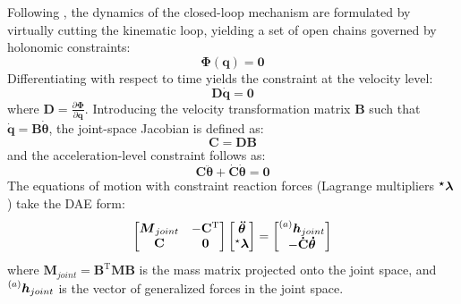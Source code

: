 Following \cite{nikravesh}, the dynamics of the closed-loop mechanism are formulated by virtually cutting the kinematic loop, yielding a set of open chains governed by holonomic constraints:
\begin{equation}
    \label{eq:general_loop_constraint}
    \boldsymbol{\Phi}(\boldsymbol{q}) = \boldsymbol{0}
\end{equation}
Differentiating with respect to time yields the constraint at the velocity level:
\begin{equation}
    \label{eq:D_matrix_beg}
    \mathbf{D}\boldsymbol{\dot q} = \boldsymbol{0}
\end{equation}
where $\mathbf{D} = \frac{\partial \boldsymbol{\Phi}}{\partial \boldsymbol{q}}$. Introducing the velocity transformation matrix $\mathbf{B}$ such that $\boldsymbol{\dot q}= \mathbf{B}\boldsymbol{\dot \theta}$, the joint-space Jacobian is defined as:
\begin{equation}
    \label{eq:C_matrix_beg}
    \mathbf{C}=\mathbf{D}\mathbf{B}
\end{equation}
and the acceleration-level constraint follows as:
\begin{equation}
    \label{eq:acceleration_constraint}
    \mathbf{C}\boldsymbol{\ddot \theta} + \mathbf{\dot C}\boldsymbol{\dot \theta}= \boldsymbol{0}
\end{equation}
The equations of motion with constraint reaction forces (Lagrange multipliers $\boldsymbol{\prescript{\star}{}{}\lambda}$) take the DAE form:
\begin{equation}
    \label{eq:general_DAE}
    \begin{bmatrix}
        \boldsymbol{M}_{joint}&-\mathbf{C}^\mathrm{T}\\
        \mathbf{C}&\boldsymbol{0}
    \end{bmatrix}
    \begin{bmatrix}
        \boldsymbol{\ddot\theta}\\
        \prescript{\star}{}{}\boldsymbol{\lambda}
    \end{bmatrix}
    =
    \begin{bmatrix}
        \prescript{(a)}{}{\boldsymbol{h}_{joint}}\\
        -\mathbf{\dot C}\boldsymbol{\dot \theta}
    \end{bmatrix}
\end{equation}
where $\boldsymbol{M}_{joint} = \mathbf{B}^\mathrm{T}\boldsymbol{M}\mathbf{B}$ is the mass matrix projected onto the joint space, and $\prescript{(a)}{}{\boldsymbol{h}_{joint}}$ is the vector of generalized forces in the joint space.

